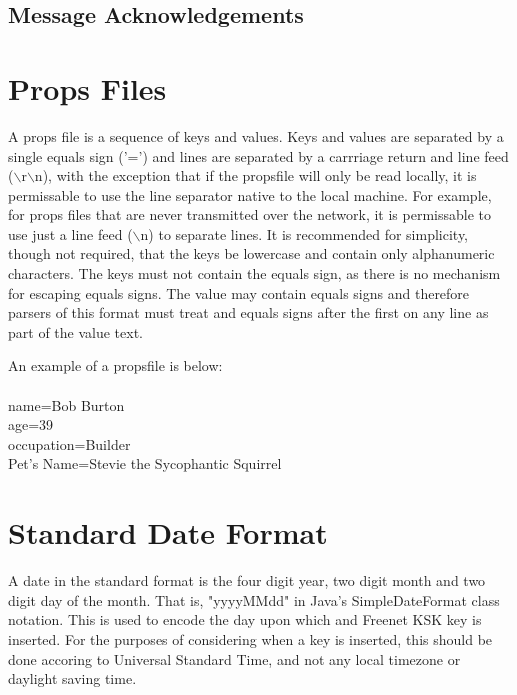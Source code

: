 \documentclass[12pt,a4paper]{article}
\begin{document}
\subsection{Message Acknowledgements}

\appendix

\section{Props Files}
\label{PropsFile}
A props file is a sequence of keys and values. Keys and values are separated by a single equals sign ('=') and lines are separated by a carrriage return and line feed ($\backslash$r$\backslash$n), with the exception that if the propsfile will only be read locally, it is permissable to use the line separator native to the local machine. For example, for props files that are never transmitted over the network, it is permissable to use just a line feed ($\backslash$n) to separate lines. It is recommended for simplicity, though not required, that the keys be lowercase and contain only alphanumeric characters. The keys must not contain the equals sign, as there is no mechanism for escaping equals signs. The value may contain equals signs and therefore parsers of this format must treat and equals signs after the first on any line as part of the value text.

An example of a propsfile is below: \\
\\
name=Bob Burton \\
age=39 \\
occupation=Builder \\
Pet's Name=Stevie the Sycophantic Squirrel \\

\section{Standard Date Format}
\label{standard_date}
A date in the standard format is the four digit year, two digit month and two digit day of the month. That is, "yyyyMMdd" in Java's SimpleDateFormat class notation. This is used to encode the day upon which and Freenet KSK key is inserted. For the purposes of considering when a key is inserted, this should be done accoring to Universal Standard Time, and not any local timezone or daylight saving time.
\end{document}
